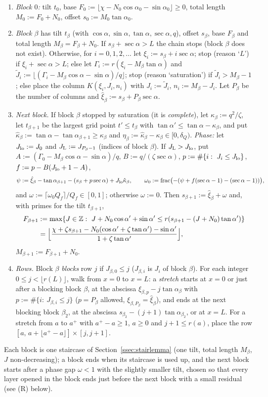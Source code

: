 \documentclass[11pt]{amsart}
\newcommand{\Z}{\mathbb Z}
\newcommand{\ca}{\cos\alpha}
\newcommand{\sa}{\sin\alpha}
\newcommand{\ta}{\tan\alpha}
\newcommand{\se}{\sec\alpha}
\newcommand{\caz}{\cos\alpha_0}
\newcommand{\saz}{\sin\alpha_0}
\newcommand{\taz}{\tan\alpha_0}
\theoremstyle{definition}
\theoremstyle{remark}
\numberwithin{equation}{section}
\begin{document}
\begin{enumerate}[label=(Z\arabic*)]
\item \emph{Block $0$:} tilt $t_0$, base $F_0:=\lfloor\chi-N_0\caz-\saz\rfloor\ge0$, total length $M_0:=F_0+N_0$, offset
$s_0:=M_0\taz$.
\item \emph{Block $\beta$} has tilt $t_\beta$ (with $\ca,\sa,\ta,\se,q$), offset $s_\beta$, base $F_\beta$ and total
length $M_\beta=F_\beta+N_0$. If $s_\beta+\se>L$ the chain stops (block $\beta$ does not exist). Otherwise, for
$i=0,1,2,\dots$ let $\xi_i:=s_\beta+i\se$; stop (reason `$L$') if $\xi_i+\se>L$; else let
$\Gamma_i:=r(\xi_i-M_\beta\ta)$ and $\tilde J_i:=\lfloor(\Gamma_i-M_\beta\ca-\sa)/q\rfloor$; stop (reason
`saturation') if $\tilde J_i>M_\beta-1$; else place the column $K(\xi_i,J_i,n_i)$ with $J_i:=\tilde J_i$,
$n_i:=M_\beta-J_i$. Let $P_\beta$ be the number of columns and $\hat\xi_\beta:=s_\beta+P_\beta\se$.
\item \emph{Next block.} If block $\beta$ stopped by saturation (it is \emph{complete}), let $\kappa_\beta:=q^2/\zeta$,
let $t_{\beta+1}$ be the largest grid point $t'\le t_\beta$ with $\tan\alpha'\le\ta-\kappa_\beta$, and put
$\hat\kappa_\beta:=\ta-\tan\alpha_{\beta+1}\ge\kappa_\beta$ and $\eta_\beta:=\hat\kappa_\beta-\kappa_\beta\in[0,\delta_Q)$.
\emph{Phase:} let $J_{\rm lo}:=J_0$ and $J_{\rm L}:=J_{P_\beta-1}$ (indices of block $\beta$). If $J_{\rm L}>J_{\rm lo}$, put
$A:=(\Gamma_0-M_\beta\ca-\sa)/q$, $B:=q/(\zeta\se)$, $p:=\#\{i:\ J_i\le J_{\rm lo}\}$, $f:=p-B(J_{\rm lo}+1-A)$,
\[
\psi:=\hat\xi_\beta-\tan\alpha_{\beta+1}-(s_\beta+p\se)+J_{\rm lo}\hat\kappa_\beta,\qquad
\omega_0:=\operatorname{frac}\bigl(-(\psi+f(\se-1)-(\se-1))\bigr),
\]
and $\omega:=\lceil\omega_0Q_f\rceil/Q_f\in[0,1]$; otherwise $\omega:=0$. Then $s_{\beta+1}:=\hat\xi_\beta+\omega$ and,
with primes for the tilt $t_{\beta+1}$,
\begin{align*}
F_{\beta+1}&:=\max\{J\in\Z:\ J+N_0\ca'+\sa'\le r(s_{\beta+1}-(J+N_0)\ta')\}\\
&=\Bigl\lfloor\frac{\chi+\zeta s_{\beta+1}-N_0(\ca'+\zeta\ta')-\sa'}{1+\zeta\ta'}\Bigr\rfloor,
\end{align*}
$M_{\beta+1}:=F_{\beta+1}+N_0$.
\item \emph{Rows.} Block $\beta$ \emph{blocks} row $j$ if $J_{\beta,0}\le j$ ($J_{\beta,i}$ is $J_i$ of block $\beta$).
For each integer $0\le j<\lfloor r(L)\rfloor$, walk from $x=0$ to $x=L$: a \emph{stretch} starts at $x=0$ or just after
a blocking block $\beta$, at the abscissa $\xi_{\beta,p}-j\tan\alpha_\beta$ with $p:=\#\{i:\ J_{\beta,i}\le j\}$
($p=P_\beta$ allowed, $\xi_{\beta,P_\beta}=\hat\xi_\beta$), and ends at the next blocking block $\beta_2$, at the
abscissa $s_{\beta_2}-(j+1)\tan\alpha_{\beta_2}$, or at $x=L$. For a stretch from $a$ to $a^+$ with $a^+-a\ge1$, $a\ge0$
and $j+1\le r(a)$, place the row $[a,\,a+\lfloor a^+-a\rfloor]\times[j,j+1]$.
\end{enumerate}
Each block is one staircase of Section~\ref{ssec:stairlemma} (one tilt, total length $M_\beta$, $J$ non-decreasing); a
block ends when its staircase is used up, and the next block starts after a phase gap $\omega<1$ with the slightly
smaller tilt, chosen so that every layer opened in the block ends just before the next block with a small residual
(see (R) below).
\end{document}
